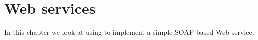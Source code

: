 \chapter{\go Web services}
\label{web}

In this chapter we look at using \go to implement a simple SOAP-based Web service.
